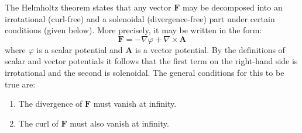 \documentclass[12pt]{article}
\begin{document}
The Helmholtz theorem states that any vector $\mathbf{F}$ may be decomposed into an irrotational (curl-free) and a solenoidal (divergence-free) part under certain conditions (given below). More precisely, it may be written in the form:
\begin{equation}
\mathbf{F} = -\nabla \varphi + \nabla \times \mathbf{A}
\end{equation}
where $\varphi$ is a scalar potential and $\mathbf{A}$ is a vector potential. By the definitions of scalar and vector potentials it follows that the first term on the right-hand side is irrotational and the second is solenoidal. The  general conditions for this to be true are:
\begin{enumerate}
\item The divergence of $\mathbf{F}$ must vanish at infinity.
\item The curl of $\mathbf{F}$ must also vanish at infinity.
\end{enumerate}

\end{document}
